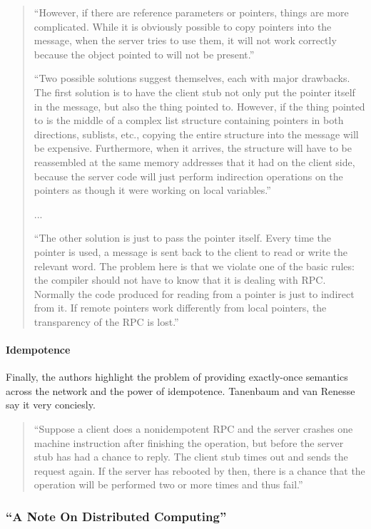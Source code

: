 \begin{quote}
``However, if there are reference parameters or pointers, things are more complicated.  While it is obviously possible to copy pointers into the message, when the server tries to use them, it will not work correctly because the object pointed to will not be present.''

``Two possible solutions suggest themselves, each with major drawbacks. The first solution is to have the client stub not only put the pointer itself in the message, but also the thing pointed to. However, if the thing pointed to is the middle of a complex list structure containing pointers in both directions, sublists, etc., copying the entire structure into the message will be expensive. Furthermore, when it arrives, the structure will have to be reassembled at the same memory addresses that it had on the client side, because the server code will just perform indirection operations on the pointers as though it were working on local variables.''

...

``The other solution is just to pass the pointer itself. Every time the pointer is used, a message is sent back to the client to read or write the relevant word. The problem here is that we violate one of the basic rules: the compiler should not have to know that it is dealing with RPC. Normally the code produced for reading from a pointer is just to indirect from it. If remote pointers work differently from local pointers, the transparency of the RPC is lost.''
\end{quote}

\paragraph{Idempotence} Finally, the authors highlight the problem of providing exactly-once semantics across the network and the power of idempotence.  Tanenbaum and van Renesse say it very conciesly.

\begin{quote}
``Suppose a client does a nonidempotent RPC and the server crashes one machine instruction after finishing the operation, but before the server stub has had a chance to reply. The client stub times out and sends the request again. If the server has rebooted by then, there is a chance that the operation will be performed two or more times and thus fail.''
\end{quote}

\subsubsection{``A Note On Distributed Computing''}

